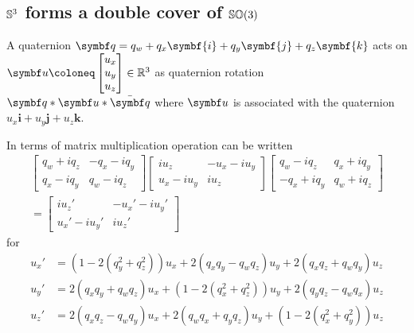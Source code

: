 \subsection{\texorpdfstring{${\mathbb{S}^3}$}{S3} forms a double cover of \texorpdfstring{${\mathbb{SO}(3)}$}{SO(3)}}

A quaternion $\bq = q_w + q_x \symbf{i} + q_y \symbf{j} + q_z \symbf{k}$ acts on $\bu \coloneq \begin{bmatrix} u_x \\ u_y \\ u_z \end{bmatrix} \in \mathbb{R}^3$ as quaternion rotation $\bq * \bu * \bar {\bq}$ where $\bu$ is associated with the quaternion $u_x \symbf{i} + u_y \symbf{j} + u_z \symbf{k}$.

In terms of matrix multiplication operation can be written
\begin{equation}
  \begin{aligned}
    \begin{bmatrix}
      q_w + i q_z & -q_x - i q_y \\
      q_x - i q_y & q_w - i q_z
    \end{bmatrix} \begin{bmatrix}
      i u_z       & -u_x - i u_y \\
      u_x - i u_y & i u_z
    \end{bmatrix} \begin{bmatrix}
      q_w - i q_z   & q_x + i q_y \\
      - q_x + i q_y & q_w + i q_z
    \end{bmatrix} \\
    = \begin{bmatrix}
      i u_z'        & -u_x' - i u_y' \\
      u_x' - i u_y' & i u_z'
    \end{bmatrix}
  \end{aligned}
\end{equation}
for
\begin{equation}
  \label{eq:quat_rotation}
  \begin{aligned}
    u_x' & = (1 - 2(q_y^2 + q_z^2)) u_x + 2(q_x q_y - q_w q_z) u_y + 2( q_x q_z + q_w q_y ) u_z   \\
    u_y' & = 2(q_x q_y + q_w q_z) u_x + (1 - 2 (q_x^2 + q_z^2)) u_y + 2( q_y q_z-q_w q_x) u_z     \\
    u_z' & = 2 (q_x q_z  - q_w q_y) u_x  + 2 (q_w q_x + q_y q_z) u_y + (1 - 2(q_x^2 + q_y^2)) u_z
  \end{aligned}
\end{equation}
